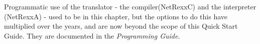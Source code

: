 



Programmatic use of the translator - the compiler(NetRexxC) and the
interpreter (NetRexxA) - used to be in this chapter, but the options
to do this have multiplied over the years, and are now beyond the scope
of this Quick Start Guide. They are documented in the \emph{Programming Guide}.
